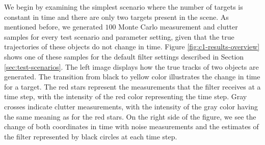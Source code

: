 
We begin by examining the simplest scenario where the number of targets is constant in time and there are only two targets present in the scene. As mentioned before, we generated $100$ Monte Carlo measurement and clutter samples for every test scenario and parameter setting, given that the true trajectories of these objects do not change in time. Figure \ref{fig:c1-results-overview} shows one of these samples for the default filter settings described in Section \ref{sec:test-scenarios}. The left image displays how the true tracks of two objects are generated. The transition from black to yellow color illustrates the change in time for a target. The red stars represent the measurements that the filter receives at a time step, with the intensity of the red color representing the time step. Gray crosses indicate clutter measurements, with the intensity of the gray color having the same meaning as for the red stars. On the right side of the figure, we see the change of both coordinates in time with noise measurements and the estimates of the filter represented by black circles at each time step.

